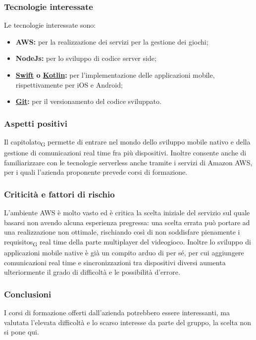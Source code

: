 \subsubsection{Tecnologie interessate}
    Le tecnologie interessate sono:
    \begin{itemize}
    	\item \textbf{AWS: }per la realizzazione dei servizi per la gestione dei giochi;
    	\item \textbf{NodeJs: }per lo sviluppo di codice server side;
    	\item \textbf{\href{https://swift.org/about/}{Swift} o \href{https://kotlinlang.org/}{Kotlin}: }per l'implementazione delle applicazioni mobile, rispettivamente per iOS e Android;
    	\item \textbf{\href{https://git-scm.com/about}{Git}: }per il versionamento del codice sviluppato.
    \end{itemize}
\subsubsection{Aspetti positivi}
    Il \gls{capitolato}\textsubscript{G} permette di entrare nel mondo dello sviluppo mobile nativo e della gestione di comunicazioni real time fra più dispositivi. Inoltre consente anche di familiarizzare con le tecnologie serverless anche tramite i servizi di Amazon AWS, per i quali l'azienda proponente prevede corsi di formazione.
\subsubsection{Criticità e fattori di rischio}
    L'ambiente AWS è molto vasto ed è critica la scelta iniziale del servizio sul quale basarsi non avendo alcuna esperienza pregressa: una scelta errata può portare ad una realizzazione non ottimale, rischiando così di non soddisfare pienamente i \glspl{requisito}\textsubscript{G} real time della parte multiplayer del videogioco. Inoltre lo sviluppo di applicazioni mobile native è già un compito arduo di per sé, per cui aggiungere comunicazioni real time e sincronizzazioni tra dispositivi diversi aumenta ulteriormente il grado di difficoltà e le possibilità d'errore.
\subsubsection{Conclusioni}
    I corsi di formazione offerti dall'azienda potrebbero essere interessanti, ma valutata l'elevata difficoltà e lo scarso interesse da parte del gruppo, la scelta non si pone qui.